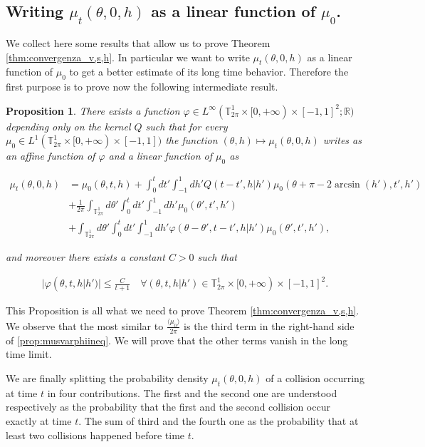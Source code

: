 \documentclass[a4paper,10pt,reqno]{amsart}
\newtheorem{proposition}{Proposition}[section]
\numberwithin{equation}{subsection}
\numberwithin{figure}{subsection}
\begin{document}
\subsection{Writing $\mu_t(\theta,0,h)$ as a linear function of $\mu_0$.}
We collect here some results that allow us to prove Theorem \ref{thm:convergenza_v,s,h}. In particular we want to write $\mu_t(\theta,0,h)$ as a linear function of $\mu_0$ to get a better estimate of its long time behavior. Therefore the first purpose is to prove now the following intermediate result.
\begin{proposition}\label{prop:musvarphi}
There exists a function $\varphi\in L^{\infty}(\mathbb{T}^1_{2\pi}\times[0,+\infty)\times[-1,1]^2;\mathbb{R})$ depending only on the kernel $Q$ such that for every $\mu_0\in L^1(\mathbb{T}^1_{2\pi}\times[0,+\infty)\times[-1,1])$ the function $(\theta,h)\mapsto\mu_t(\theta,0,h)$ writes as an affine function of $\varphi$ and a linear function of $\mu_0$ as

\begin{align}
\nonumber\mu_t(\theta,0,h)&=\mu_0(\theta,t,h)+\int_0^tdt'\int_{-1}^1dh'Q(t-t',h|h')\mu_0(\theta+\pi-2\arcsin(h'),t',h')
\\
\nonumber&+\frac{1}{2\pi}\int_{\mathbb{T}^1_{2\pi}}d\theta'\int_0^tdt'\int_{-1}^1dh'\mu_0(\theta',t',h')
\\
\label{prop:musvarphiineq}&+\int_{\mathbb{T}^1_{2\pi}}d\theta'\int_0^tdt'\int_{-1}^1dh'\varphi(\theta-\theta',t-t',h|h')\mu_0(\theta',t',h'),
\end{align}

and moreover there exists a constant $C>0$ such that

\begin{align*}
|\varphi(\theta,t,h|h')|\leq\frac{C}{t+1}\quad\forall(\theta,t,h|h')\in\mathbb{T}^1_{2\pi}\times[0,+\infty)\times[-1,1]^2.
\end{align*}

\end{proposition}
This Proposition is all what we need to prove Theorem \ref{thm:convergenza_v,s,h}. We observe that the most similar to $\frac{\langle\mu_0\rangle}{2\pi}$ is the third term in the right-hand side of \eqref{prop:musvarphiineq}. We will prove that the other terms vanish in the long time limit.

We are finally splitting the probability density $\mu_t(\theta,0,h)$ of a collision occurring at time $t$ in four contributions. The first and the second one are understood respectively as the probability that the first and the second collision occur exactly at time $t$. The sum of third and the fourth one as the probability that at least two collisions happened before time $t$.
\end{document}
